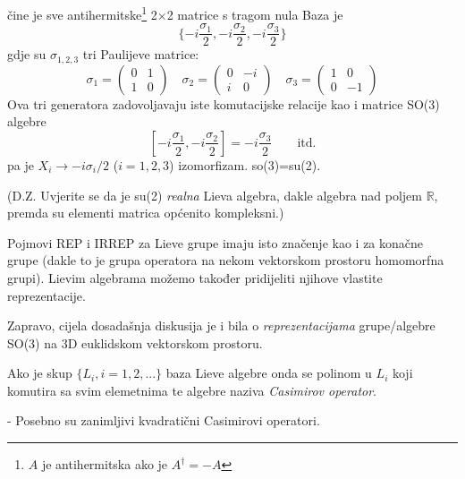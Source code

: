 \begin{primjer}
 čine je sve antihermitske\footnote{$A$ je antihermitska ako je $A^\dagger=-A$} 
2$\times$2 matrice s tragom nula Baza je 
\[
     \{ -i\frac{\sigma_1}{2},  -i\frac{\sigma_2}{2},  -i\frac{\sigma_3}{2} \}
\]
gdje su $\sigma_{1,2,3}$ tri Paulijeve matrice:
\begin{equation}
\sigma_1=\left( \begin{array}{cc} 0 &  1 \\ 1 & 0 \end{array} \right)
\quad
\sigma_2=\left( \begin{array}{cc} 0 & -i \\ i & 0 \end{array} \right)
\quad
\sigma_3=\left( \begin{array}{cc} 1 &  0 \\ 0 &-1 \end{array} \right)
\label{eq:PaulijeveMatrice}
\end{equation}
Ova tri generatora zadovoljavaju iste komutacijske relacije kao i matrice
SO(3) algebre
\begin{displaymath}
 \left[ -i\frac{\sigma_1}{2}, -i\frac{\sigma_2}{2} \right] =
 -i\frac{\sigma_3}{2} \qquad \text{itd.}
\end{displaymath}
pa je $X_i \to -i \sigma_i/2$ ($i=1,2,3$) izomorfizam.
so(3)=su(2).

(D.Z. Uvjerite se da je su(2) \emph{realna} Lieva algebra, dakle algebra
nad poljem $\mathbb{R}$, premda su elementi matrica općenito kompleksni.)
\end{primjer}

Pojmovi REP i IRREP za Lieve grupe imaju isto značenje kao i za
konačne grupe (dakle to je grupa operatora na nekom vektorskom prostoru
homomorfna grupi). Lievim algebrama možemo također pridijeliti
njihove vlastite reprezentacije.

Zapravo, cijela dosadašnja diskusija je i bila o 
\emph{reprezentacijama} grupe/algebre  SO(3) na 3D euklidskom 
vektorskom prostoru.

\begin{definicija}
Ako je skup $\{L_i, i=1,2, ... \}$ baza Lieve algebre onda se polinom
u $L_i$ koji komutira sa svim elemetnima te algebre naziva 
\emph{Casimirov operator}.
\end{definicija}

- Posebno su zanimljivi kvadratični Casimirovi operatori.

